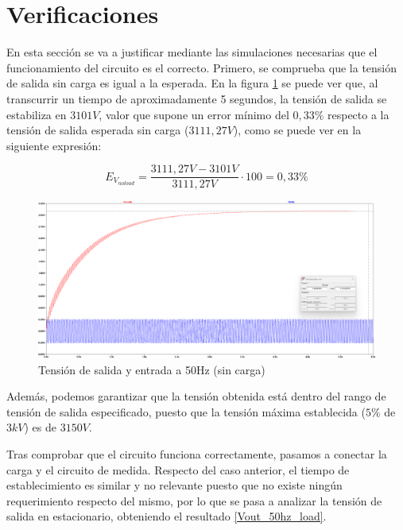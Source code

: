 \section{Verificaciones}

En esta sección se va a justificar mediante las simulaciones necesarias que el funcionamiento del circuito es el correcto.
Primero, se comprueba que la tensión de salida sin carga es igual a la esperada. En la figura \ref{Vout_50hz} se puede ver que, al transcurrir
un tiempo de aproximadamente 5 segundos, la tensión de salida se estabiliza en $3101V$, valor que supone un error mínimo del $0,33\%$
respecto a la tensión de salida esperada sin carga ($3111,27V$), como se puede ver en la siguiente expresión:

\begin{equation}
    E_{V_{noload}} = \frac{3111,27V - 3101V}{3111,27V} \cdot 100 = 0,33\%
\end{equation}

\begin{figure}[H]
    \centering
    \includegraphics[width=1\textwidth]{Imagenes_alvaro/Vout_50hz.png}
    \caption{Tensión de salida y entrada a 50Hz (sin carga)}
    \label{Vout_50hz}
\end{figure}

Además, podemos garantizar que la tensión obtenida está dentro del rango de tensión de salida especificado, puesto que la tensión máxima 
establecida ($5\%$ de $3kV$) es de $3150V$.

Tras comprobar que el circuito funciona correctamente, pasamos a conectar la carga y el circuito de medida.
Respecto del caso anterior, el tiempo de establecimiento es similar y no relevante puesto que no existe ningún requerimiento respecto del mismo, por lo que
se pasa a analizar la tensión de salida en estacionario, obteniendo el resultado \ref{Vout_50hz_load}.

